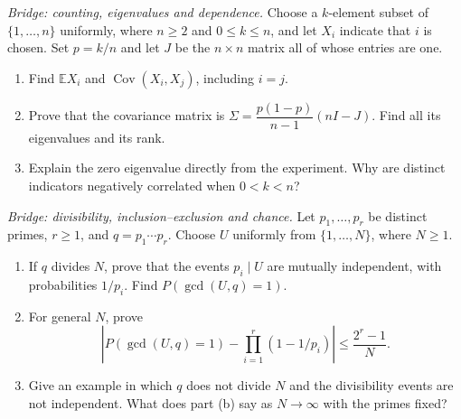 \begin{exercise}[$\star\star$]\label{ex:covariance-sampling}
\emph{Bridge: counting, eigenvalues and dependence.} Choose a $k$-element subset
of $\{1,\ldots,n\}$ uniformly, where $n\ge2$ and $0\le k\le n$, and let
$X_i$ indicate that $i$ is chosen. Set $p=k/n$ and let $J$ be the $n\times n$
matrix all of whose entries are one.
\begin{enumerate}[label=(\alph*)]
\item Find $\mathbb EX_i$ and $\operatorname{Cov}(X_i,X_j)$, including $i=j$.
\item Prove that the covariance matrix is
$\Sigma=\dfrac{p(1-p)}{n-1}(nI-J)$. Find all its eigenvalues and its rank.
\item Explain the zero eigenvalue directly from the experiment. Why are distinct
indicators negatively correlated when $0<k<n$?
\end{enumerate}
\end{exercise}

\begin{exercise}[$\star\star$]\label{ex:arithmetic-independence}
\emph{Bridge: divisibility, inclusion--exclusion and chance.} Let
$p_1,\ldots,p_r$ be distinct primes, $r\ge1$, and $q=p_1\cdots p_r$.
Choose $U$ uniformly from $\{1,\ldots,N\}$, where $N\ge1$.
\begin{enumerate}[label=(\alph*)]
\item If $q$ divides $N$, prove that the events $p_i\mid U$ are mutually
independent, with probabilities $1/p_i$. Find $P(\gcd(U,q)=1)$.
\item For general $N$, prove
\[
 \left|P(\gcd(U,q)=1)-\prod_{i=1}^r(1-1/p_i)\right|
 \le\frac{2^r-1}{N}.
\]
\item Give an example in which $q$ does not divide $N$ and the divisibility
events are not independent. What does part (b) say as $N\to\infty$ with the
primes fixed?
\end{enumerate}
\end{exercise}

